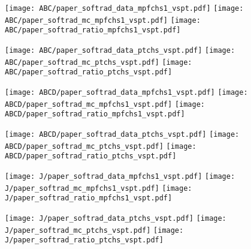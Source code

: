 \documentclass[landscape,10pt]{beamer} %
\begin{document}
\newpage

\begin{figure}[p]
\centering
  \texttt{[image: ABC/paper\_softrad\_data\_mpfchs1\_vspt.pdf]}
  \texttt{[image: ABC/paper\_softrad\_mc\_mpfchs1\_vspt.pdf]}
  \texttt{[image: ABC/paper\_softrad\_ratio\_mpfchs1\_vspt.pdf]}
\end{figure}

\begin{figure}[p]
\centering
  \texttt{[image: ABC/paper\_softrad\_data\_ptchs\_vspt.pdf]}
  \texttt{[image: ABC/paper\_softrad\_mc\_ptchs\_vspt.pdf]}
  \texttt{[image: ABC/paper\_softrad\_ratio\_ptchs\_vspt.pdf]}
\end{figure}

\newpage

\begin{figure}[p]
\centering
  \texttt{[image: ABCD/paper\_softrad\_data\_mpfchs1\_vspt.pdf]}
  \texttt{[image: ABCD/paper\_softrad\_mc\_mpfchs1\_vspt.pdf]}
  \texttt{[image: ABCD/paper\_softrad\_ratio\_mpfchs1\_vspt.pdf]}
\end{figure}

\begin{figure}[p]
\centering
  \texttt{[image: ABCD/paper\_softrad\_data\_ptchs\_vspt.pdf]}
  \texttt{[image: ABCD/paper\_softrad\_mc\_ptchs\_vspt.pdf]}
  \texttt{[image: ABCD/paper\_softrad\_ratio\_ptchs\_vspt.pdf]}
\end{figure}

\newpage

\begin{figure}[p]
\centering
  \texttt{[image: J/paper\_softrad\_data\_mpfchs1\_vspt.pdf]}
  \texttt{[image: J/paper\_softrad\_mc\_mpfchs1\_vspt.pdf]}
  \texttt{[image: J/paper\_softrad\_ratio\_mpfchs1\_vspt.pdf]}
\end{figure}

\begin{figure}[p]
\centering
  \texttt{[image: J/paper\_softrad\_data\_ptchs\_vspt.pdf]}
  \texttt{[image: J/paper\_softrad\_mc\_ptchs\_vspt.pdf]}
  \texttt{[image: J/paper\_softrad\_ratio\_ptchs\_vspt.pdf]}
\end{figure}

\newpage
\end{document}
